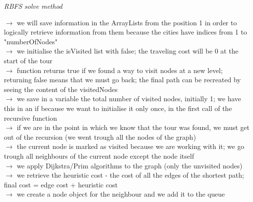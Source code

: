 \documentclass[12pt, a4paper]{article}
\begin{document}
\newpage
\centering
\large
\textit{RBFS solve method}

\vspace{5mm}
\begin{flushleft}
\hspace{3mm}$\rightarrow$ we will save information in the ArrayLists from the position 1 in order to logically retrieve information from them because the cities have indices from 1 to "numberOfNodes"\\

\hspace{3mm}$\rightarrow$ we initialise the isVisited list with false; the traveling cost will be 0 at the start of the tour\\

\hspace{3mm}$\rightarrow$ function returns true if we found a way to visit nodes at a new level; returning false means that we must go back; the final path can be recreated by seeing the content of the visitedNodes\\

\hspace{3mm}$\rightarrow$ we save in a variable the total number of visited nodes, initially 1; we have this in an if because we want to initialise it only once, in the first call of the recursive function\\

\hspace{3mm}$\rightarrow$ if we are in the point in which we know that the tour was found, we must get out of the recursion (we went trough all the nodes of the graph)\\

\hspace{3mm}$\rightarrow$ the current node is marked as visited because we are working with it; we go trough all neighbours of the current node except the node itself\\

\hspace{3mm}$\rightarrow$ we apply Dijkstra/Prim algorithms to the graph (only the unvisited nodes)\\

\hspace{3mm}$\rightarrow$ we retrieve the heuristic cost - the cost of all the edges of the shortest path; final cost = edge cost + heuristic cost\\

\hspace{3mm}$\rightarrow$ we create a node object for the neighbour and we add it to the queue\\


\end{flushleft}
\end{document}
